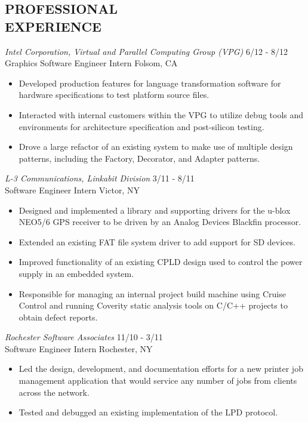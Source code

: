 \documentclass[line,margin]{res}
\begin{document}
\begin{resume}
\section{PROFESSIONAL \\EXPERIENCE} 
	 {\sl Intel Corporation, Virtual and Parallel Computing Group (VPG) } \hfill   6/12 - 8/12\\
                Graphics Software Engineer Intern \hfill Folsom, CA
                 \begin{itemize}  \itemsep -2pt %
                 \item Developed production features for language transformation software for hardware specifications to test platform source files.
		\item Interacted with internal customers within the VPG to utilize debug tools and environments for architecture specification and post-silicon testing.
		 \item Drove a large refactor of an existing system to make use of multiple design patterns, including the Factory, Decorator, and Adapter patterns.
                 \end{itemize} 
	
	{\sl L-3 Communications, Linkabit Division} \hfill 3/11 - 8/11\\
	      Software Engineer Intern \hfill Victor, NY
                 \begin{itemize}  \itemsep -2pt %
                 \item Designed and implemented a library and supporting drivers for the u-blox NEO5/6 GPS receiver to be driven by an Analog Devices Blackfin processor.
		\item Extended an existing FAT file system driver to add support for SD devices.
		\item Improved functionality of an existing CPLD design used to control the power supply in an embedded system.
		\item Responsible for managing an internal project build machine using Cruise Control and running Coverity static analysis tools on C/C++ projects to obtain defect reports.
                \end{itemize}

	{\sl Rochester Software Associates} \hfill 11/10 - 3/11\\
	      Software Engineer Intern \hfill Rochester, NY
                 \begin{itemize}  \itemsep -2pt %
                 \item Led the design, development, and documentation efforts for a new printer job management application that would service any number of jobs from clients across the network.
		\item Tested and debugged an existing implementation of the LPD protocol.
                \end{itemize}


\end{resume}
\end{document}
